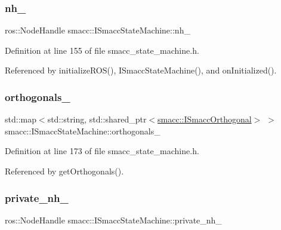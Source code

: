 \subsubsection{\texorpdfstring{nh\+\_\+}{nh\_}}
{\footnotesize\ttfamily ros\+::\+Node\+Handle smacc\+::\+I\+Smacc\+State\+Machine\+::nh\+\_\+\hspace{0.3cm}{\ttfamily [protected]}}



Definition at line 155 of file smacc\+\_\+state\+\_\+machine.\+h.



Referenced by initialize\+R\+O\+S(), I\+Smacc\+State\+Machine(), and on\+Initialized().

\mbox{\label{classsmacc_1_1ISmaccStateMachine_acc5944f313bc6ce1637c632243a511f2}} 
\subsubsection{\texorpdfstring{orthogonals\+\_\+}{orthogonals\_}}
{\footnotesize\ttfamily std\+::map$<$std\+::string, std\+::shared\+\_\+ptr$<$\hyperlink{classsmacc_1_1ISmaccOrthogonal}{smacc\+::\+I\+Smacc\+Orthogonal}$>$ $>$ smacc\+::\+I\+Smacc\+State\+Machine\+::orthogonals\+\_\+\hspace{0.3cm}{\ttfamily [protected]}}



Definition at line 173 of file smacc\+\_\+state\+\_\+machine.\+h.



Referenced by get\+Orthogonals().

\mbox{\label{classsmacc_1_1ISmaccStateMachine_a9c6a5c647ecca6599589c12fdcd53bfc}} 
\subsubsection{\texorpdfstring{private\+\_\+nh\+\_\+}{private\_nh\_}}
{\footnotesize\ttfamily ros\+::\+Node\+Handle smacc\+::\+I\+Smacc\+State\+Machine\+::private\+\_\+nh\+\_\+\hspace{0.3cm}{\ttfamily [protected]}}



